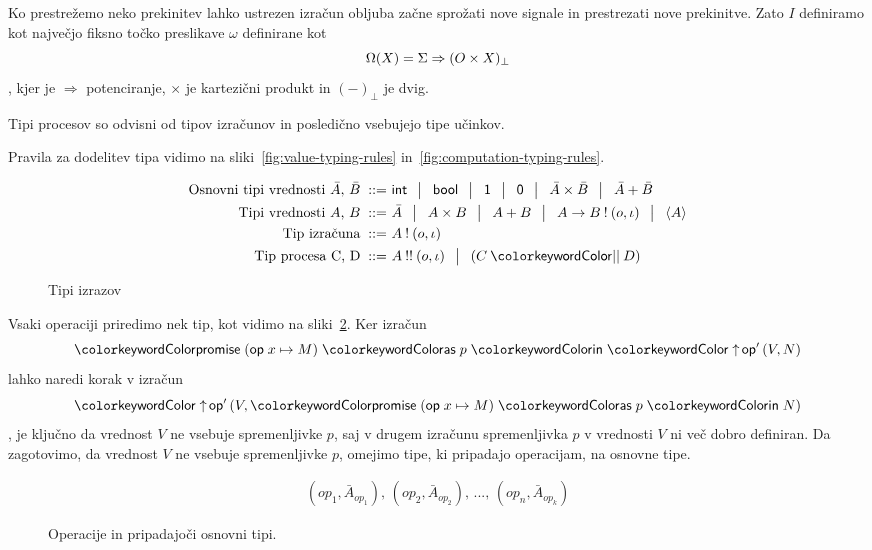 Ko prestrežemo neko prekinitev lahko ustrezen izračun obljuba začne sprožati nove signale in prestrezati nove prekinitve. Zato $I$ definiramo kot največjo fiksno točko preslikave $\omega$ definirane kot 
$$\Omega(X) = \Sigma \Rightarrow (O \times X)_\bot $$,
kjer je $\Rightarrow$ potenciranje, $\times$ je kartezični produkt in $(-)_\bot$ je dvig.


Tipi procesov so odvisni od tipov izračunov in posledično vsebujejo tipe učinkov.

Pravila za dodelitev tipa vidimo na sliki~\ref{fig:value-typing-rules} in~\ref{fig:computation-typing-rules}.


\begin{figure}[h]
	\parbox{\textwidth}{
		\centering
		\small
		\begin{align*}
		\text{Osnovni tipi vrednosti $\bar{A}$, $\bar{B}$}
		\bnfis & \tysym{int} \,\bnfor\! \tysym{bool} \,\bnfor\! \tyunit \,\bnfor\! \tyempty \,\bnfor\! \typrod{\bar{A}}{\bar{B}} \,\bnfor\! \tysum{\bar{A}}{\bar{B}}
		\\%
		\text{Tipi vrednosti $A$, $B$}
		\bnfis & \bar{A} \, \bnfor\! \typrod{A}{B} \,\bnfor\! \tysum{A}{B} \,\bnfor\! \tyfun{A}{\tycomp{B}{\o,\i}} \,\bnfor\! \typromise{A}
		\\
		\text{Tip izračuna} \bnfis& \tycomp{A}{\o,\i}
		\\
		\text{Tip procesa \tyC, \tyD}  \bnfis & \tyrun{A}{\o, \i} \,\bnfor\! \typar{\tyC}{\tyD}
		\end{align*}
	} 
	\caption{Tipi izrazov}
	\label{fig:tipi}
\end{figure}

Vsaki operaciji priredimo nek tip, kot vidimo na sliki~\ref{fig:operacije}. Ker izračun 
$$ \tmwith{op}{x}{M}{p}{\tmopout{op'}{V}{N}} $$
lahko naredi korak v izračun
$$ \tmopout{op'}{V}{\tmwith{op}{x}{M}{p}{N}} $$,
je ključno da vrednost $V$ ne vsebuje spremenljivke $p$, saj v drugem izračunu spremenljivka $p$ v vrednosti $V$ ni več dobro definiran. Da zagotovimo, da vrednost $V$ ne vsebuje spremenljivke $p$, omejimo tipe, ki pripadajo operacijam, na osnovne tipe.

\begin{figure}[t]
	\centering
	\small
	\begin{align*}
	(op_1, \bar{A}_{op_1}),\, (op_2, \bar{A}_{op_2}),\, ... ,\, (op_n, \bar{A}_{op_k})
	\end{align*}
\vspace{-5ex}
	\caption{Operacije in pripadajoči osnovni tipi.}
	\label{fig:operacije}
\end{figure}



